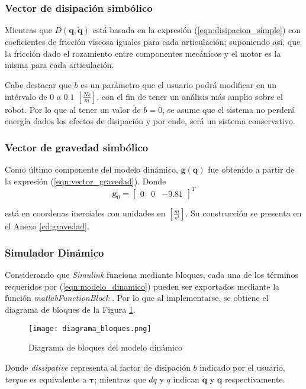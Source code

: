     \subsubsection{Vector de disipación simbólico}
    \noindent Mientras que $D(\boldsymbol{q}, \boldsymbol{\dot{q}})$ está basada en la expresión (\ref{eqn:disipacion_simple}) con coeficientes de fricción
    viscosa iguales para cada articulación; suponiendo así, que la fricción dado el rozamiento entre componentes mecánicos y el motor es la misma para cada articulación. 

    Cabe destacar que $b$ es un parámetro que el usuario podrá modificar en un intérvalo de $0$ a $0.1$ $[\frac{Ns}{m}]$, con el fin de tener un análisis más amplio sobre
    el robot. Por lo que al tener un valor de $b=0$, se asume que el sistema no perderá energía dados los efectos de disipación y por ende, será un sistema conservativo. 

    \subsubsection{Vector de gravedad simbólico}
    \noindent Como último componente del modelo dinámico, $\boldsymbol{g}(\boldsymbol{q})$ fue obtenido a partir de la expresión (\ref{eqn:vector_gravedad}). Donde
    \begin{equation}
        \label{eqn:g_0}
         \boldsymbol{g}_0 = \begin{bmatrix} 0 & 0 & -9.81 \end{bmatrix}^T
    \end{equation}

    está en coordenas inerciales con unidades en $[\frac{m}{s^2}]$. Su construcción se presenta en el Anexo \ref{cd:gravedad}.

    \subsubsection{Simulador Dinámico}
    \noindent Considerando que \emph{Simulink} funciona mediante bloques, cada una de los términos requeridos por (\ref{eqn:modelo_dinamico}) pueden ser exportados mediante la
    función \emph{matlabFunctionBlock} \cite{matlabFunctionBlock}. Por lo que al implementarse, se obtiene el diagrama de bloques de la Figura \ref{fig:diagrama_bloques}.
    \begin{figure}[H]
        \texttt{[image: diagrama\_bloques.png]}
        \centering
        \caption{Diagrama de bloques del modelo dinámico}
        \label{fig:diagrama_bloques}
    \end{figure}
    Donde \emph{dissipative} representa al factor de disipación $b$ indicado por el usuario, \emph{torque} es equivalente a $\boldsymbol{\tau}$; mientras que 
    $dq$ y $q$ indican $\boldsymbol{\dot{q}}$ y $\boldsymbol{q}$ respectivamente. 
    
